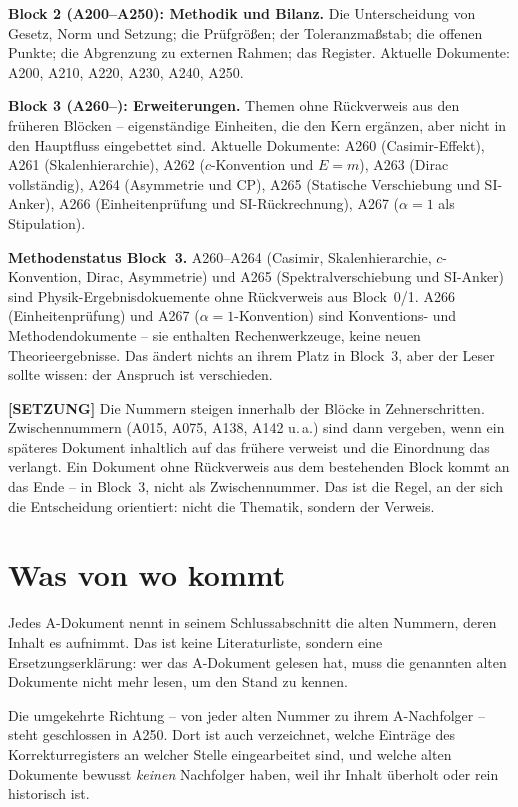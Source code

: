 \textbf{Block 2 (A200--A250): Methodik und Bilanz.} Die Unterscheidung von
Gesetz, Norm und Setzung; die Prüfgrößen; der Toleranzmaßstab; die offenen
Punkte; die Abgrenzung zu externen Rahmen; das Register.
Aktuelle Dokumente: A200, A210, A220, A230, A240, A250.

\textbf{Block 3 (A260--): Erweiterungen.} Themen ohne Rückverweis aus den
früheren Blöcken -- eigenständige Einheiten, die den Kern ergänzen, aber nicht
in den Hauptfluss eingebettet sind. Aktuelle Dokumente: A260 (Casimir-Effekt),
A261 (Skalenhierarchie), A262 ($c$-Konvention und $E=m$), A263 (Dirac
vollständig), A264 (Asymmetrie und CP), A265 (Statische Verschiebung und SI-Anker),
A266 (Einheitenprüfung und SI-Rückrechnung), A267 ($\alpha=1$ als Stipulation).

\textbf{Methodenstatus Block~3.} A260--A264 (Casimir, Skalenhierarchie,
$c$-Konvention, Dirac, Asymmetrie) und A265 (Spektralverschiebung und SI-Anker) sind
Physik-Ergebnisdokuemente ohne Rückverweis aus Block~0/1. A266 (Einheitenprüfung)
und A267 ($\alpha=1$-Konvention) sind Konventions- und Methodendokumente -- sie
enthalten Rechenwerkzeuge, keine neuen Theorieergebnisse. Das ändert nichts an
ihrem Platz in Block~3, aber der Leser sollte wissen: der Anspruch ist verschieden.

\textbf{[SETZUNG]} Die Nummern steigen innerhalb der Blöcke in Zehnerschritten.
Zwischennummern (A015, A075, A138, A142 u.\,a.) sind dann vergeben, wenn ein
späteres Dokument inhaltlich auf das frühere verweist und die Einordnung das
verlangt. Ein Dokument ohne Rückverweis aus dem bestehenden Block kommt an das
Ende -- in Block~3, nicht als Zwischennummer. Das ist die Regel, an der sich
die Entscheidung orientiert: nicht die Thematik, sondern der Verweis.

\section{Was von wo kommt}

Jedes A-Dokument nennt in seinem Schlussabschnitt die alten Nummern, deren
Inhalt es aufnimmt. Das ist keine Literaturliste, sondern eine
Ersetzungserklärung: wer das A-Dokument gelesen hat, muss die genannten alten
Dokumente nicht mehr lesen, um den Stand zu kennen.

Die umgekehrte Richtung -- von jeder alten Nummer zu ihrem A-Nachfolger --
steht geschlossen in A250. Dort ist auch verzeichnet, welche Einträge des
Korrekturregisters an welcher Stelle eingearbeitet sind, und welche alten
Dokumente bewusst \emph{keinen} Nachfolger haben, weil ihr Inhalt überholt oder
rein historisch ist.

